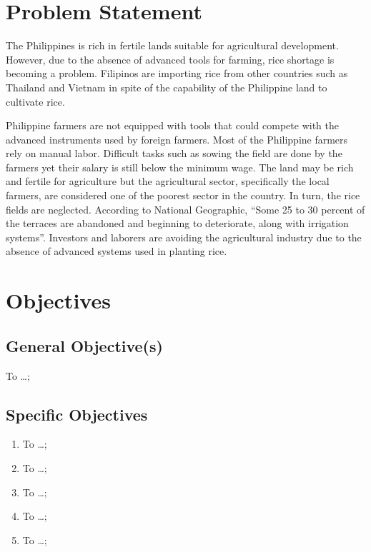 \section{Problem Statement}
The Philippines is rich in fertile lands suitable for agricultural development. However, due to the absence of advanced tools for farming, rice shortage is becoming a problem. Filipinos are importing rice from other countries such as Thailand and Vietnam in spite of the capability of the Philippine land to cultivate rice.

Philippine farmers are not equipped with tools that could compete with the advanced instruments used by foreign farmers. Most of the Philippine farmers rely on manual labor. Difficult tasks such as sowing the field are done by the farmers yet their salary is still below the minimum wage. The land may be rich and fertile for agriculture but the agricultural sector, specifically the local farmers, are considered one of the poorest sector in the country. In turn, the rice fields are neglected. According to National Geographic, “Some 25 to 30 percent of the terraces are abandoned and beginning to deteriorate, along with irrigation systems”. Investors and laborers are avoiding the agricultural industry due to the absence of advanced systems used in planting rice.





\section{Objectives}
\subsection{General Objective(s)}
To \ldots;

\subsection{Specific Objectives}

\begin{enumerate}
	\item To  \ldots;
	
	\item To  \ldots;
	
	\item To  \ldots;
	
	\item To  \ldots;
	
	\item To  \ldots;
\end{enumerate}



